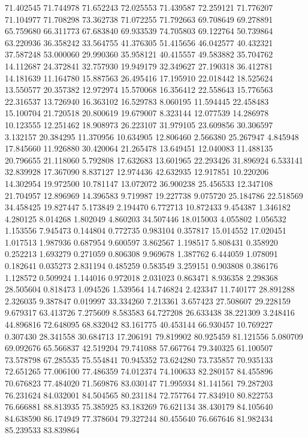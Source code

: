 71.402545
71.744978
71.652243
72.025553
71.439587
72.259121
71.776207
71.104977
71.708298
73.362738
71.072255
71.792663
69.708649
69.278891
65.759680
66.311773
67.683840
69.933539
74.705803
69.122764
50.739864
63.220936
36.358242
33.564755
41.376305
51.415656
46.042577
40.432321
37.587248
53.000060
29.990360
35.958121
40.415557
49.583882
35.704762
14.112687
24.372841
32.757930
19.949179
32.349627
27.190318
36.412781
14.181639
11.164780
15.887563
26.495416
17.195910
22.018442
18.525624
13.550577
20.357382
12.972974
15.570068
16.356412
22.558643
15.776563
22.316537
13.726940
16.363102
16.529783
8.060195
11.594445
22.458483
15.100704
21.720518
20.800619
19.679007
8.323144
12.077539
14.286978
10.123555
12.251462
18.908973
26.223107
31.979105
23.609856
30.306597
3.132157
20.384295
11.370956
10.634905
12.806460
2.566380
25.267947
4.845948
17.845660
11.926880
30.420064
21.265478
13.649451
12.040083
11.488135
20.796655
21.118060
5.792808
17.632683
13.601965
22.293426
31.896924
6.533141
32.839928
17.367090
8.837127
12.974436
42.632935
12.917851
10.220206
14.302954
19.972500
10.781147
13.072072
36.900238
25.456533
12.347108
21.704957
12.896969
14.396583
9.719987
19.227738
9.075720
25.184786
22.518569
34.458425
19.827447
5.173849
2.194470
6.772713
10.872433
9.454387
1.346182
4.280125
8.014268
1.802049
4.860203
34.507446
18.015003
4.055802
1.056532
1.153556
7.945473
0.144804
0.772735
0.983104
0.357817
15.014552
17.020451
1.017513
1.987936
0.687954
9.600597
3.862567
1.198517
5.808431
0.358920
0.252213
1.693279
0.271059
0.806308
9.969678
1.387762
6.444059
1.078091
0.182641
0.035273
2.831194
0.485259
0.583549
3.259151
0.903808
0.386176
1.128572
0.509924
1.144016
0.972018
2.031023
0.863471
8.936358
2.298368
28.505604
0.818473
1.094526
1.539564
14.746824
2.423347
11.740177
28.891288
2.326035
9.387847
0.019997
33.334260
7.213361
3.657423
27.508607
29.228159
9.679317
63.413726
7.275609
8.583583
64.727208
26.633438
38.221309
3.248416
44.896816
72.648095
68.832042
83.161775
40.453144
66.930457
10.769227
0.307430
28.341558
30.684713
17.206191
79.819902
80.925459
81.121556
5.080709
69.092676
65.566837
42.519204
79.741088
57.667764
79.340325
61.100507
73.578798
67.285535
75.554841
70.945352
73.624280
73.735857
70.935133
72.651265
77.006100
77.486359
74.012374
74.100633
82.280157
84.455896
70.676823
77.484020
71.569876
83.030147
71.995934
81.141561
79.287203
76.231624
84.032001
84.504565
80.231184
72.757764
77.834910
80.822753
76.666881
88.813935
75.385925
83.183269
76.621134
38.430179
84.105640
84.638590
86.174949
77.378604
79.327244
80.455640
76.667646
81.982434
85.239533
83.839864
